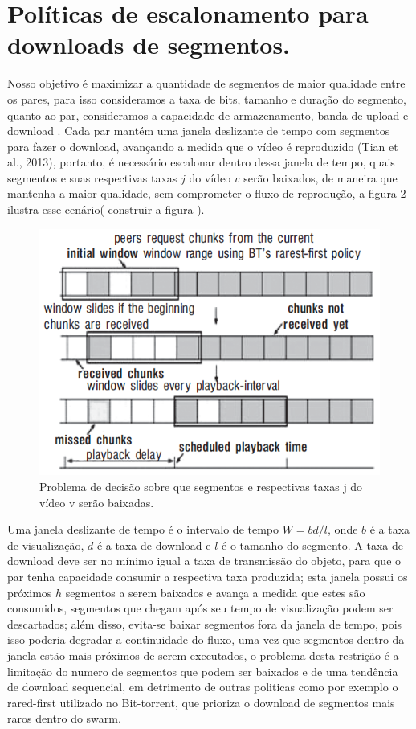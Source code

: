 \documentclass[
	12pt,				%
	oneside,			%
	a4paper,			%
	english,			%
	brazil				%
	]{abntex2ppgsi}
\begin{document}
\section{Políticas de escalonamento para downloads de segmentos.}

Nosso objetivo é maximizar a quantidade de segmentos de maior qualidade entre os pares, para isso consideramos a taxa de bits, tamanho e duração do segmento, quanto ao par, consideramos a capacidade de armazenamento, banda de upload e download . Cada par mantém uma janela deslizante de tempo com segmentos para fazer o download, avançando a medida que o vídeo é reproduzido (Tian et al., 2013), portanto, é necessário escalonar dentro dessa janela de tempo, quais segmentos e suas respectivas taxas $j$ do vídeo $v$ serão baixados, de maneira que mantenha a maior qualidade, sem comprometer o fluxo de reprodução, a figura 2 ilustra esse cenário( construir a figura ).

\begin{figure}[H]%
	\centering
 	  \caption{Problema de decisão sobre que segmentos e respectivas taxas j do vídeo v serão baixadas.}
		\includegraphics{figuras/janeladetempo.png}
\end{figure}

Uma janela deslizante de tempo é o intervalo de tempo $W=bd/l$, onde $b$ é a taxa de visualização, $d$ é a taxa de download e $l$ é o tamanho do segmento. A taxa de download deve ser no mínimo igual a taxa de transmissão do objeto, para que o par tenha capacidade consumir a respectiva taxa produzida; esta janela possui os próximos $h$ segmentos a serem baixados e avança a medida que estes são consumidos, segmentos que chegam após seu tempo de visualização podem ser descartados; além disso, evita-se baixar segmentos fora da janela de tempo, pois isso poderia degradar a continuidade do fluxo, uma vez que segmentos dentro da janela estão mais próximos de serem executados,  o problema desta restrição é a limitação do numero de segmentos que podem ser baixados e de uma tendência de download sequencial, em detrimento de outras politicas como por exemplo o rared-first utilizado no Bit-torrent, que prioriza o download de segmentos mais raros dentro do swarm.
\end{document}
